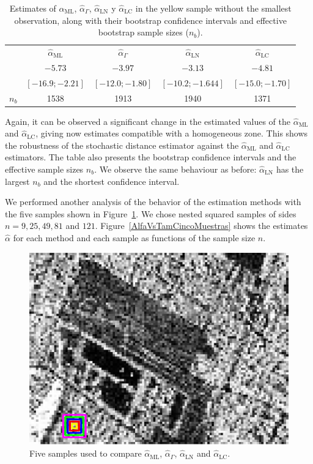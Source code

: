 \documentclass[twocolumn]{svjour3}
\begin{document}
	\begin{table}[hbt]
		\centering
		\caption{Estimates of $\widehat{\alpha}_{\text{{ML}}}$, $\widehat{\alpha}_{\Gamma}$, $\widehat{\alpha}_{\text{{LN}}}$ y $\widehat{\alpha}_{\text{{LC}}}$ in the yellow sample without the smallest observation, along with their bootstrap confidence intervals and effective bootstrap sample sizes ($n_b$).}\label{SinPrimero} 
		\begin{tabular}{c*4{c}}
			\toprule
			&  $\widehat{\alpha}_{\text{{ML}}}$    &  $\widehat{\alpha}_{\Gamma}$  &  $\widehat{\alpha}_{\text{{LN}}}$ &  $\widehat{\alpha}_{\text{{LC}}}$\\
			\cmidrule(lr){2-5}
			& $-5.73$   & $-3.97$    & $-3.13$    & $-4.81$\\
			& $[-16.9;-2.21]$ & $[-12.0;-1.80]$ & $[-10.2;-1.644]$ & $[-15.0;-1.70]$\\
			$n_{b}$	& 1538          & 1913           & 1940          &  1371 \\
			\bottomrule
		\end{tabular}
	\end{table}
	
	Again, it can be observed a significant change in the estimated values of the $\widehat{\alpha}_{\text{{ML}}}$ and $\widehat{\alpha}_{\text{{LC}}}$, giving now estimates compatible with a homogeneous zone. This shows the robustness of the stochastic distance estimator against the $\widehat{\alpha}_{\text{{ML}}}$ and $\widehat{\alpha}_{\text{{LC}}}$ estimators.
	The table also presents the bootstrap confidence intervals and the effective sample sizes $n_b$. 
	We observe the same behaviour as before: $\widehat{\alpha}_{\text{{LN}}}$ has the largest $n_b$ and the shortest confidence interval.
	

	We performed another analysis of the behavior of the estimation methods with the five samples shown in Figure~\ref{CincoMuestras}. 
	We chose nested squared samples of sides $n=9,25,49,81$ and $121$. 
	Figure~\ref{AlfaVsTamCincoMuestras} shows the estimates $\widehat{\alpha}$ for each method and each sample as functions of the sample size $n$. 
	
	\begin{figure}[hbt]
		\centering
		\includegraphics[width=0.7\linewidth]{CincoMuestras.eps}
		\caption{Five samples used to compare $\widehat{\alpha}_{\text{{ML}}}$, $\widehat{\alpha}_{\Gamma}$, $\widehat{\alpha}_{\text{{LN}}}$ and  $\widehat{\alpha}_{\text{{LC}}}$.}\label{CincoMuestras}
	\end{figure}
	
\end{document}
